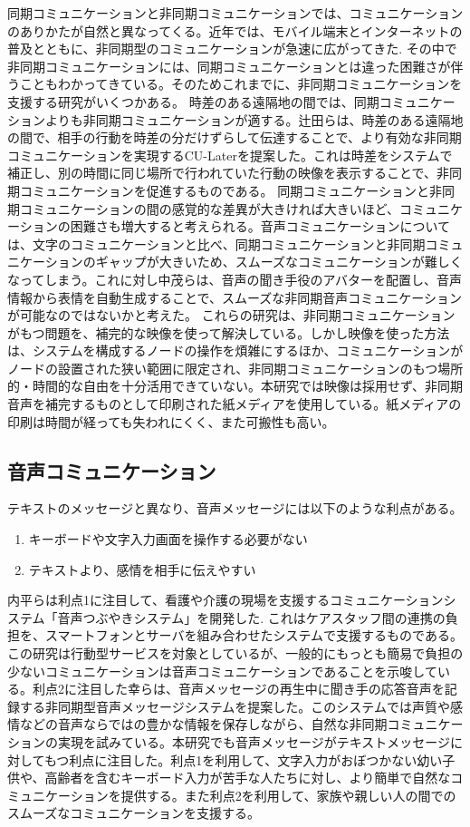 \documentclass[submit,techrep,noauthor]{ipsj}
\begin{document}
同期コミュニケーションと非同期コミュニケーションでは、コミュニケーションのありかたが自然と異なってくる。近年では、モバイル端末とインターネットの普及とともに、非同期型のコミュニケーションが急速に広がってきた\cite{white_paper_infor_commun_japan-1}.
その中で非同期コミュニケーションには、同期コミュニケーションとは違った困難さが伴うこともわかってきている。そのためこれまでに、非同期コミュニケーションを支援する研究がいくつかある。
時差のある遠隔地の間では、同期コミュニケーションよりも非同期コミュニケーションが適する。辻田らは、時差のある遠隔地の間で、相手の行動を時差の分だけずらして伝達することで、より有効な非同期コミュニケーションを実現するCU-Laterを提案した。これは時差をシステムで補正し、別の時間に同じ場所で行われていた行動の映像を表示することで、非同期コミュニケーションを促進するものである。
同期コミュニケーションと非同期コミュニケーションの間の感覚的な差異が大きければ大きいほど、コミュニケーションの困難さも増大すると考えられる。音声コミュニケーションについては、文字のコミュニケーションと比べ、同期コミュニケーションと非同期コミュニケーションのギャップが大きいため、スムーズなコミュニケーションが難しくなってしまう。これに対し中茂らは、音声の聞き手役のアバターを配置し、音声情報から表情を自動生成することで、スムーズな非同期音声コミュニケーションが可能なのではないかと考えた。
これらの研究は、非同期コミュニケーションがもつ問題を、補完的な映像を使って解決している。しかし映像を使った方法は、システムを構成するノードの操作を煩雑にするほか、コミュニケーションがノードの設置された狭い範囲に限定され、非同期コミュニケーションのもつ場所的・時間的な自由を十分活用できていない。本研究では映像は採用せず、非同期音声を補完するものとして印刷された紙メディアを使用している。紙メディアの印刷は時間が経っても失われにくく、また可搬性も高い。

\subsection{音声コミュニケーション}
テキストのメッセージと異なり、音声メッセージには以下のような利点がある。
\begin{enumerate}
    \item キーボードや文字入力画面を操作する必要がない
    \item テキストより、感情を相手に伝えやすい
\end{enumerate}
内平らは利点1に注目して、看護や介護の現場を支援するコミュニケーションシステム「音声つぶやきシステム」を開発した\cite{tsubuyaki-service}. これはケアスタッフ間の連携の負担を、スマートフォンとサーバを組み合わせたシステムで支援するものである。この研究は行動型サービスを対象としているが、一般的にもっとも簡易で負担の少ないコミュニケーションは音声コミュニケーションであることを示唆している。利点2に注目した幸ら\cite{asynchronous-message}は、音声メッセージの再生中に聞き手の応答音声を記録する非同期型音声メッセージシステムを提案した。このシステムでは声質や感情などの音声ならではの豊かな情報を保存しながら、自然な非同期コミュニケーションの実現を試みている。本研究でも音声メッセージがテキストメッセージに対してもつ利点に注目した。利点1を利用して、文字入力がおぼつかない幼い子供や、高齢者を含むキーボード入力が苦手な人たちに対し、より簡単で自然なコミュニケーションを提供する。また利点2を利用して、家族や親しい人の間でのスムーズなコミュニケーションを支援する。
\end{document}
